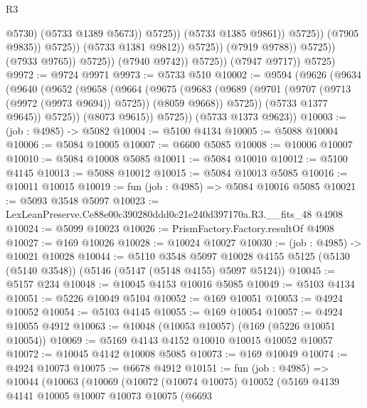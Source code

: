 \begin{lexlean}{R3}
\begin{coremodule}
                                                    @5730)
                                                  (@5733 @1389 @5673))
                                                @5725))
                                            (@5733 @1385 @9861))
                                          @5725))
                                      (@7905 @9835))
                                    @5725))
                                (@5733 @1381 @9812))
                              @5725))
                          (@7919 @9788))
                        @5725))
                    (@7933 @9765))
                  @5725))
              (@7940 @9742))
            @5725))
        (@7947 @9717))
      @5725)
@9972 := @9724 @9971
@9973 := @5733 @510
@10002 := @9594
    (@9626
      (@9634
        (@9640
          (@9652
            (@9658
              (@9664
                (@9675
                  (@9683
                    (@9689 (@9701 (@9707 (@9713 (@9972 (@9973 @9694)) @5725)) (@8059 @9668)) @5725))
                  (@5733 @1377 @9645))
                @5725))
            (@8073 @9615))
          @5725))
      (@5733 @1373 @9623))
@10003 := (job : @4985) -> @5082
@10004 := @5100 @4134
@10005 := @5088 @10004
@10006 := @5084 @10005
@10007 := @6600 @5085
@10008 := @10006 @10007
@10010 := @5084 @10008 @5085
@10011 := @5084 @10010
@10012 := @5100 @4145
@10013 := @5088 @10012
@10015 := @5084 @10013 @5085
@10016 := @10011 @10015
@10019 := fun (job : @4985) => @5084 @10016 @5085
@10021 := @5093 @3548 @5097
@10023 := LexLeanPreserve.Ce88e00c390280ddd0c21e240d397170a.R3.__fits_48 @4908
@10024 := @5099 @10023
@10026 := PrismFactory.Factory.resultOf @4908
@10027 := @169 @10026
@10028 := @10024 @10027
@10030 := (job : @4985) -> @10021 @10028
@10044 := @5110
    @3548
    @5097
    @10028
    @4155
    @5125
    (@5130 (@5140 @3548))
    (@5146 (@5147 (@5148 @4155) @5097 @5124))
@10045 := @5157 @234
@10048 := @10045 @4153 @10016 @5085
@10049 := @5103 @4134
@10051 := @5226 @10049 @5104
@10052 := @169 @10051
@10053 := @4924 @10052
@10054 := @5103 @4145
@10055 := @169 @10054
@10057 := @4924 @10055 @4912
@10063 := @10048 (@10053 @10057) (@169 (@5226 @10051 @10054))
@10069 := @5169 @4143 @4152 @10010 @10015 @10052 @10057
@10072 := @10045 @4142 @10008 @5085
@10073 := @169 @10049
@10074 := @4924 @10073
@10075 := @6678 @4912
@10151 := fun (job : @4985) =>
  @10044
    (@10063
      (@10069
        (@10072
          (@10074 @10075)
          @10052
          (@5169
            @4139
            @4141
            @10005
            @10007
            @10073
            @10075
            (@6693

\end{coremodule}
\end{lexlean}
